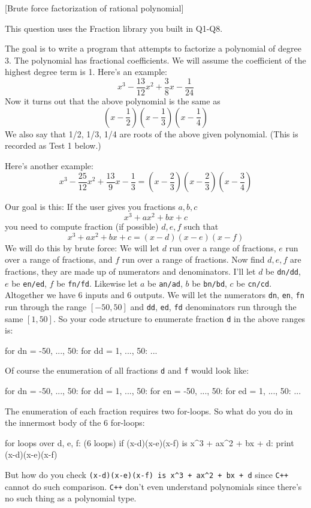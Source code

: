 [Brute force factorization of rational polynomial]

This question uses the Fraction library you built in Q1-Q8.

The goal is to write a program that attempts to factorize a polynomial of degree
3. The polynomial has fractional coefficients.
We will assume the coefficient of the highest degree term is 1.
Here's an example:
\[
  x^3 - \frac{13}{12} x^2 + \frac{3}{8}x - \frac{1}{24}
\]
Now it turns out that the above polynomial is the same as
\[
  \left( x - \frac{1}{2} \right)
  \left( x - \frac{1}{3} \right)
  \left( x - \frac{1}{4} \right)
\]
We also say that 1/2, 1/3, 1/4 are roots of the above given polynomial.
(This is recorded as Test 1 below.)

Here's another example:
\[
  x^3 - \frac{25}{12}x^2 + \frac{13}{9}x - \frac{1}{3} =
  \left( x - \frac{2}{3} \right)
  \left( x - \frac{2}{3} \right)
  \left( x - \frac{3}{4} \right)  
\]

Our goal is this: If the user gives you fractions $a,b,c$
\[
  x^3 + ax^2 + bx + c
\]
you need to compute fraction (if possible) $d,e,f$ such that
\[
  x^3 + ax^2 + bx + c = (x - d)(x - e)(x - f)
\]
We will do this by brute force:
We will let $d$ run over a range of fractions, $e$ run over a range of fractions,
and $f$ run over a range of fractions.
Now find $d,e,f$ are fractions, they are made up of numerators and denominators.
I'll let
$d$ be \verb!dn/dd!,
$e$ be \verb!en/ed!,
$f$ be \verb!fn/fd!.
Likewise let 
$a$ be \verb!an/ad!,
$b$ be \verb!bn/bd!,
$c$ be \verb!cn/cd!.
Altogether we have 6 inputs and 6 outputs.
We will let the numerators
\verb!dn!,
\verb!en!,
\verb!fn!
run through the range $[-50, 50]$ and
\verb!dd!,
\verb!ed!,
\verb!fd!
denominators run through the same $[1, 50]$.
So your code structure to enumerate fraction \verb!d! in the above ranges is:
\begin{console}
for dn = -50, ..., 50:
    for dd = 1, ..., 50:
        ... 
\end{console}
Of course the enumeration of all fractions \verb!d! and \verb!f! would look like:      
\begin{console}
for dn = -50, ..., 50:
    for dd = 1, ..., 50:
        for en = -50, ..., 50:
            for ed = 1, ..., 50:
                ... 
\end{console}
The enumeration of each fraction requires two for-loops.
So what do you do in the innermost body of the 6 for-loops:
\begin{console}
for loops over d, e, f: (6 loops)
         if (x-d)(x-e)(x-f) is x^3 + ax^2 + bx + d:
             print (x-d)(x-e)(x-f)
\end{console}
But how do you check
\verb!(x-d)(x-e)(x-f) is x^3 + ax^2 + bx + d! since \texttt{C++}
cannot do such comparison.
\texttt{C++}
don't even understand polynomials since there's no such thing as a polynomial type.

